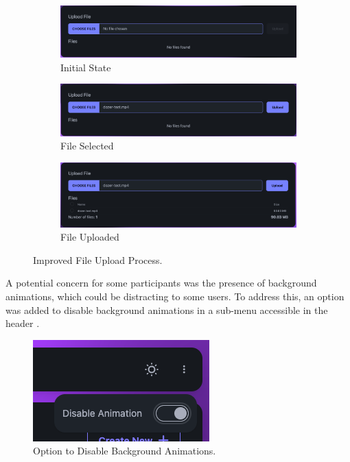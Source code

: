 \begin{figure}[htb]
  \begin{subfigure}{\textwidth}
    \centering
    \includegraphics[width=.8\linewidth]{figures/fix-4.1.png}
    \caption{Initial State}
  \end{subfigure}
  \begin{subfigure}{\textwidth}
    \centering
    \includegraphics[width=.8\linewidth]{figures/fix-4.2.png}
    \caption{File Selected}
  \end{subfigure}
  \begin{subfigure}{\textwidth}
    \centering
    \includegraphics[width=.8\linewidth]{figures/fix-4.3.png}
    \caption{File Uploaded}
  \end{subfigure}
	\caption{Improved File Upload Process.}
  \label{fig:fix-4}
\end{figure}

A potential concern for some participants was the presence of background animations, which could be distracting to some users.
To address this, an option was added to disable background animations in a sub-menu accessible in the header .

\begin{figure}[htb]
  \centering
  \includegraphics[width=.5\textwidth]{figures/fix-5.png}
  \caption{Option to Disable Background Animations.}
  \label{fig:fix-5}
\end{figure}